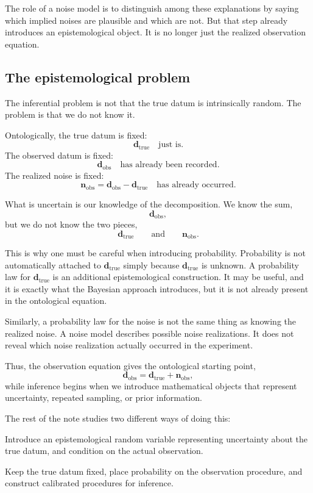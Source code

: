 \documentclass[11pt]{article}
\newcommand{\dtrue}{\mathbf d_{\mathrm{true}}}
\newcommand{\dobs}{\mathbf d_{\mathrm{obs}}}
\newcommand{\nobs}{\mathbf n_{\mathrm{obs}}}
\begin{document}
The role of a noise model is to distinguish among these explanations by saying which implied noises are plausible and which are not. But that step already introduces an epistemological object. It is no longer just the realized observation equation.

\subsection{The epistemological problem}

The inferential problem is not that the true datum is intrinsically random. The problem is that we do not know it.

Ontologically, the true datum is fixed:
\[
    \dtrue
    \quad
    \text{just is.}
\]
The observed datum is fixed:
\[
    \dobs
    \quad
    \text{has already been recorded.}
\]
The realized noise is fixed:
\[
    \nobs
    =
    \dobs-\dtrue
    \quad
    \text{has already occurred.}
\]

What is uncertain is our knowledge of the decomposition. We know the sum,
\[
    \dobs,
\]
but we do not know the two pieces,
\[
    \dtrue
    \qquad
    \text{and}
    \qquad
    \nobs.
\]

This is why one must be careful when introducing probability. Probability is not automatically attached to \(\dtrue\) simply because \(\dtrue\) is unknown. A probability law for \(\dtrue\) is an additional epistemological construction. It may be useful, and it is exactly what the Bayesian approach introduces, but it is not already present in the ontological equation.

Similarly, a probability law for the noise is not the same thing as knowing the realized noise. A noise model describes possible noise realizations. It does not reveal which noise realization actually occurred in the experiment.

Thus, the observation equation gives the ontological starting point,
\[
    \dobs=\dtrue+\nobs,
\]
while inference begins when we introduce mathematical objects that represent uncertainty, repeated sampling, or prior information.

The rest of the note studies two different ways of doing this:
\begin{description}[leftmargin=2.8cm,style=nextline]
    \item[Bayesian construction.]
    Introduce an epistemological random variable representing uncertainty about the true datum, and condition on the actual observation.

    \item[Frequentist construction.]
    Keep the true datum fixed, place probability on the observation procedure, and construct calibrated procedures for inference.
\end{description}
\end{document}
